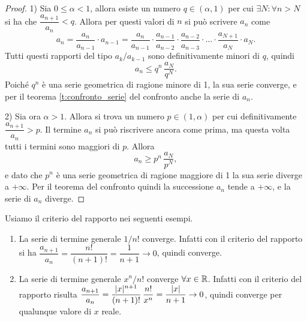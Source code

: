 \begin{proof}
1) Sia $0\leq\alpha<1$, allora esiste un numero $q\in(\alpha,1)$ per cui $\exists N\colon\forall n>N$ si ha che $\dfrac{a_{n+1}}{a_n}<q$. Allora per questi valori di $n$ si può scrivere $a_n$ come
\[
a_n=\frac{a_n}{a_{n-1}}\cdot a_{n-1}=\frac{a_n}{a_{n-1}}\cdot\frac{a_{n-1}}{a_{n-2}}\cdot\frac{a_{n-2}}{a_{n-3}}\cdot\dots\cdot\frac{a_{N+1}}{a_N}\cdot a_N.
\]
Tutti questi rapporti del tipo $a_k/a_{k-1}$ sono definitivamente minori di $q$, quindi
\[
a_n\leq q^n\,\frac{a_N}{q^N}.
\]
Poiché $q^n$ è una serie geometrica di ragione minore di 1, la sua serie converge, e per il teorema \ref{t:confronto_serie} del confronto anche la serie di $a_n$.

2) Sia ora $\alpha>1$. Allora si trova un numero $p\in(1,\alpha)$ per cui definitivamente $\dfrac{a_{n+1}}{a_n}>p$. Il termine $a_n$ si può riscrivere ancora come prima, ma questa volta tutti i termini sono maggiori di $p$. Allora
\[
a_n\geq p^n\,\frac{a_N}{p^N},
\]
e dato che $p^n$ è una serie geometrica di ragione maggiore di 1 la sua serie diverge a $+\infty$. Per il teorema del confronto quindi la successione $a_n$ tende a $+\infty$, e la serie di $a_n$ diverge.
\end{proof}
\begin{esempio} \label{es:serie-criterio-rapporto}
	Usiamo il criterio del rapporto nei seguenti esempi.
	\begin{enumerate}
		\item La serie di termine generale $1/n!$ converge. Infatti con il criterio del rapporto si ha $\dfrac{a_{n+1}}{a_n}=\dfrac{n!}{(n+1)!}=\dfrac1{n+1}\to 0$, quindi converge.
		\item La serie di termine generale $x^n/n!$ converge $\forall x\in\mathbb{R}$. Infatti con il criterio del rapporto risulta $\dfrac{a_{n+1}}{a_n}=\dfrac{\lvert x\rvert^{n+1}}{(n+1)!}\,\dfrac{n!}{x^n}=\dfrac{\lvert x\rvert}{n+1}\to 0$, quindi converge per qualunque valore di $x$ reale.
	\end{enumerate}
\end{esempio}

